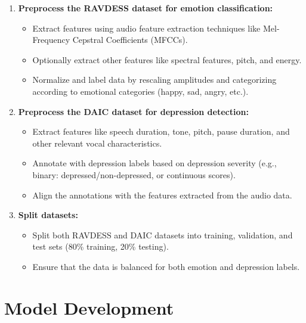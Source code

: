 \begin{enumerate}
    \item \textbf{Preprocess the RAVDESS dataset for emotion classification:}
    \begin{itemize}
        \item Extract features using audio feature extraction techniques like Mel-Frequency Cepstral Coefficients (MFCCs).
        \item Optionally extract other features like spectral features, pitch, and energy.
        \item Normalize and label data by rescaling amplitudes and categorizing according to emotional categories (happy, sad, angry, etc.).
    \end{itemize}
    \item \textbf{Preprocess the DAIC dataset for depression detection:}
    \begin{itemize}
        \item Extract features like speech duration, tone, pitch, pause duration, and other relevant vocal characteristics.
        \item Annotate with depression labels based on depression severity (e.g., binary: depressed/non-depressed, or continuous scores).
        \item Align the annotations with the features extracted from the audio data.
    \end{itemize}
    \item \textbf{Split datasets:}
    \begin{itemize}
        \item Split both RAVDESS and DAIC datasets into training, validation, and test sets (80\% training, 20\% testing).
        \item Ensure that the data is balanced for both emotion and depression labels.
    \end{itemize}
\end{enumerate}

\section{Model Development}

